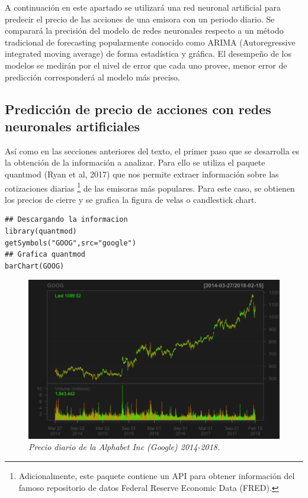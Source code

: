 \documentclass[letterpaper,12pt, spanish, oneside]{book} %
\let\oldfootnote\footnote
\renewcommand{\footnote}[1]{%
  \begingroup%
  \linespread{1.2}%
  \oldfootnote{#1}%
  \endgroup%
}
\begin{document}
A continuación en este apartado se utilizará una red neuronal artificial para predecir el precio de las acciones de una emisora con un periodo diario. Se comparará la precisión del modelo de redes neuronales respecto a un método tradicional de forecasting popularmente conocido como ARIMA (Autoregressive integrated moving average) de forma estadística y gráfica. El desempeño de los modelos se medirán por el nivel de error que cada uno provee, menor error de predicción corresponderá al modelo más preciso. 

\subsection{Predicción de precio de acciones con redes neuronales artificiales}

Así como en las secciones anteriores del texto, el primer paso que se desarrolla es la obtención de la información a analizar. Para ello se utiliza el paquete quantmod (Ryan et al, 2017) que nos permite extraer información sobre las cotizaciones diarias \footnote{Adicionalmente, este paquete contiene un API para obtener información del famoso repositorio de datos Federal Reserve Economic Data (FRED). } de las emisoras más populares. Para este caso, se obtienen los precios de cierre y se grafica la figura de velas o candlestick chart.

\begin{lstlisting}
## Descargando la informacion
library(quantmod)
getSymbols("GOOG",src="google")
## Grafica quantmod
barChart(GOOG)
\end{lstlisting}

\begin{figure}[H]
\centering
\includegraphics[width=1\textwidth]{google1.png}
\caption{\label{fig:frog2}\textit{Precio diario de la Alphabet Inc (Google) 2014-2018.}}
\end{figure}
\end{document}
